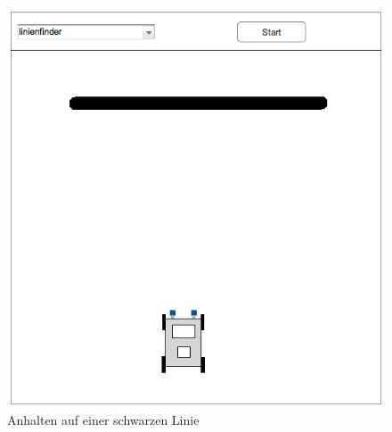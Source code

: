 \documentclass[paper=a4, DIV=14, BCOR=15mm, twoside=on, onecolumn=on, open = right, titlepage =on, parskip =half, headsepline = on, footsepline = on, chapterprefix = on, appendixprefix = off, fontsize = 12pt, numbers = noenddot, abstract = on]{scrbook}
\begin{document}

\begin{figure}[htbp]
\centering
\includegraphics[scale=0.4]{images/mockup_linienfinder.png}
\caption{Anhalten auf einer schwarzen Linie}
\label{fig:linienfinder}
\end{figure}
\end{document}
